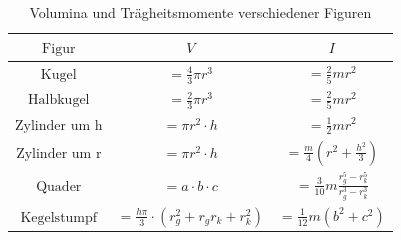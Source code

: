   \begin{table}
    \centering
    \caption{Volumina und Trägheitsmomente verschiedener Figuren}
    \label{tab:Formeln}
    \begin{tabular}{c c c}
    \toprule
    $\text{Figur}$ & $V$ & $I$ \\
    \midrule
     $\text{Kugel}$         & $ = \frac{4}{3} \pi r^3 $                                        & $ = \frac{2}{5} m r^2 $ \\                        
     $\text{Halbkugel}$     & $ = \frac{2}{3} \pi r^3 $                                        & $ = \frac{2}{5} m r^2 $ \\
     $\text{Zylinder um h}$ & $ = \pi r^2 \cdot h $                                            & $ = \frac{1}{2} m r^2 $ \\
     $\text{Zylinder um r}$ & $ = \pi r^2 \cdot h $                                            & $ = \frac{m}{4} \left(r^2 + \frac{h^2}{3} \right)$ \\
     $\text{Quader}$        & $ = a\cdot b \cdot c$                                            & $ = \frac{3}{10} m \frac{r_g^5 - r_k^5}{r_g^3 - r_k^3}$ \\
     $\text{Kegelstumpf}$   & $ = \frac{h \pi}{3}\cdot \left(r_g^2 + r_g r_k + r_k^2 \right) $ & $ = \frac{1}{12} m \left(b^2 + c^2 \right)$ \\
    \bottomrule
    \end{tabular}
    \end{table}

